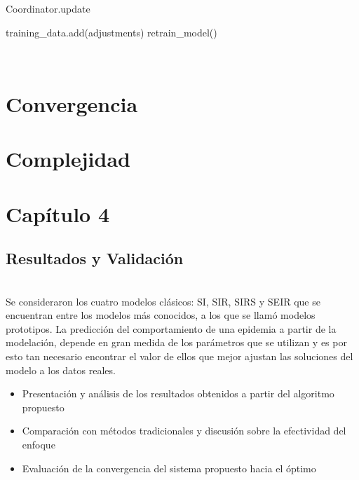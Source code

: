 \documentclass{article}
\begin{document}
 \begin{algorithm}[H]
 \caption{Coordinator.update}
 training\_data.add(adjustments)\;
 retrain\_model()\;
 \end{algorithm} \\

\newpage

 \section*{Convergencia}
 
 
 \section*{Complejidad}

    
 

\newpage

\section*{ \Huge Capítulo 4 }
\label{sec:17}
\subsection*{ \Large Resultados y Validación } \\

    Se consideraron los cuatro modelos clásicos:
    SI, SIR, SIRS y SEIR que se encuentran entre los modelos más conocidos, a los
    que se llamó modelos prototipos.
    La predicción del comportamiento de una epidemia a partir de la modelación,
    depende en gran medida de los parámetros que se utilizan y es por esto tan
    necesario encontrar el valor de ellos que mejor ajustan las soluciones del modelo
    a los datos reales. \\

    \begin{itemize}
        \item  Presentación y análisis de los resultados obtenidos a partir del algoritmo propuesto
        \item  Comparación con métodos tradicionales y discusión sobre la efectividad del enfoque
        \item  Evaluación de la convergencia del sistema propuesto hacia el óptimo
    \end{itemize}
\end{document}

